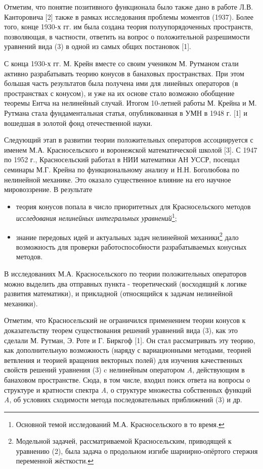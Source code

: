 Отметим, что понятие позитивного функционала было также дано в работе Л.В. Канторовича [2]  также в рамках исследования проблемы моментов (1937). Более того, конце 1930-х гг. им была создана теория полуупорядоченных пространств, позволяющая, в частности, ответить на вопрос о положительной разрешимости уравнений вида (3) в одной из самых общих постановок [1].

С конца 1930-х гг. М. Крейн вместе со своим учеником М. Рутманом стали активно разрабатывать теорию конусов в банаховых пространствах. При этом б\textit{о}льшая часть результатов была получена ими для линейных операторов (в пространствах с конусом), и уже на их основе стало возможно обобщение теоремы Ентча на нелинейный случай. Итогом 10-летней работы М. Крейна и М. Рутмана стала фундаментальная статья, опубликованная в УМН в 1948 г. [1] и вошедшая в золотой фонд отечественной науки.

Следующий этап в развитии теории положительных операторов ассоциируется с именем М.А. Красносельского и воронежской математической школой [3]. С 1947 по 1952 г., Красносельский работал в НИИ математики АН УССР, посещал семинары М.Г. Крейна по функциональному анализу и Н.Н. Боголюбова по нелинейной механике. Это оказало существенное влияние на его научное мировоззрение. В результате
\begin{itemize}
	\item теория конусов попала в число приоритетных для Красносельского методов \textit{исследования нелинейных интегральных уравнений}\footnote{Основной темой   исследований М.А. Красносельского в то время.};
		\item знание передовых идей и актуальных задач нелинейной механики\footnote{Модельной задачей, рассматриваемой Красносельским, приводящей к уравнению (2), была задача о продольном изгибе шарнирно-опёртого стержня переменной жёсткости.} дало возможность для проверки работоспособности разрабатываемых конусных методов.
	\end{itemize}
В исследованиях М.А. Красносельского по теории положительных операторов можно выделить два отправных пункта - теоретический (восходящий к логике развития математики), и прикладной (относящийся к задачам нелинейной механики).
	
	Отметим, что Красносельский не ограничился применением теории конусов к доказательству теорем существования решений  уравнений вида (3), как это сделали М. Рутман, Э. Роте и Г. Биркгоф [1]. Он стал рассматривать эту теорию, как дополнительную возможность (наряду с вариационными методами, теорией ветвления и теорией вращения векторных полей) для изучения качественных свойств решений уравнения (3) c нелинейным оператором \textit{A}, действующим в банаховом пространстве. Сюда, в том числе, входил поиск ответа на вопросы о структуре и кратности спектра \textit{A}, о структуре множества собственных функций \textit{A}, об условиях сходимости метода последовательных приближений (3) и др.
	
